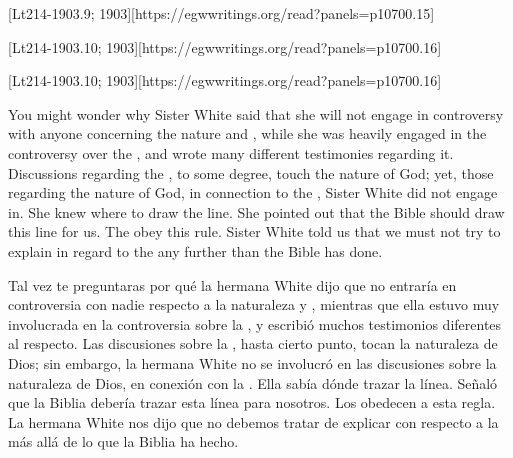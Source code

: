 [Lt214-1903.9; 1903][https://egwwritings.org/read?panels=p10700.15]


[Lt214-1903.10; 1903][https://egwwritings.org/read?panels=p10700.16]


[Lt214-1903.10; 1903][https://egwwritings.org/read?panels=p10700.16]


You might wonder why Sister White said that she will not engage in controversy with anyone concerning the nature and , while she was heavily engaged in the controversy over the , and wrote many different testimonies regarding it. Discussions regarding the , to some degree, touch the nature of God; yet, those regarding the nature of God, in connection to the , Sister White did not engage in. She knew where to draw the line. She pointed out that the Bible should draw this line for us.  The  obey this rule. Sister White told us that we must not try to explain in regard to the  any further than the Bible has done.


Tal vez te preguntaras por qué la hermana White dijo que no entraría en controversia con nadie respecto a la naturaleza y , mientras que ella estuvo muy involucrada en la controversia sobre la , y escribió muchos testimonios diferentes al respecto. Las discusiones sobre la , hasta cierto punto, tocan la naturaleza de Dios; sin embargo, la hermana White no se involucró en las discusiones sobre la naturaleza de Dios, en conexión con la . Ella sabía dónde trazar la línea. Señaló que la Biblia debería trazar esta línea para nosotros.  Los  obedecen a esta regla. La hermana White nos dijo que no debemos tratar de explicar con respecto a la  más allá de lo que la Biblia ha hecho.



